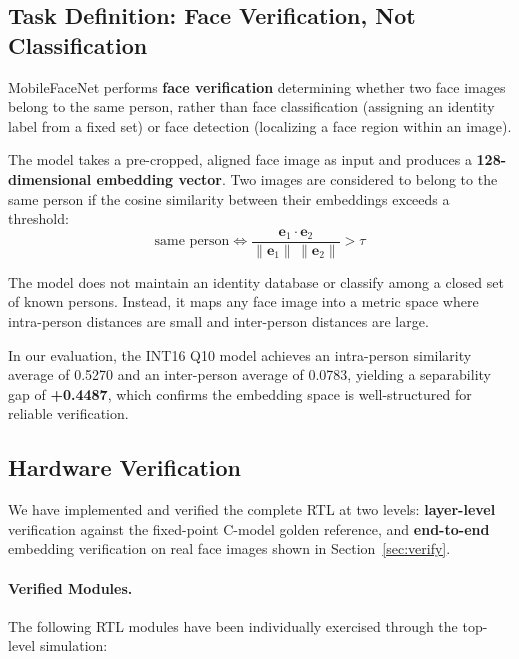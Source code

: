 \subsection{Task Definition: Face Verification, Not Classification}

MobileFaceNet performs \textbf{face verification} determining whether two face images belong to the same person, rather than face classification (assigning an identity label from a fixed set) or face detection (localizing a face region within an image).

The model takes a pre-cropped, aligned face image as input and produces a \textbf{128-dimensional embedding vector}. Two images are considered to belong to the same person if the cosine similarity between their embeddings exceeds a threshold:
\[
  \text{same person} \iff
  \frac{\mathbf{e}_1 \cdot \mathbf{e}_2}{\|\mathbf{e}_1\|\,\|\mathbf{e}_2\|} > \tau
\]

The model does not maintain an identity database or classify among a closed set of known persons. Instead, it maps any face image into a metric space where intra-person distances are small and inter-person distances are large.

In our evaluation, the INT16 Q10 model achieves an intra-person similarity average of 0.5270 and an inter-person average of 0.0783, yielding a separability gap of \textbf{+0.4487}, which confirms the embedding space is well-structured for reliable verification.

\subsection{Hardware Verification}

We have implemented and verified the complete RTL at two levels: \textbf{layer-level} verification against the fixed-point C-model golden reference, and \textbf{end-to-end} embedding verification on real face images shown in Section~\ref{sec:verify}.

\paragraph{Verified Modules.}
The following RTL modules have been individually exercised through the top-level simulation:

